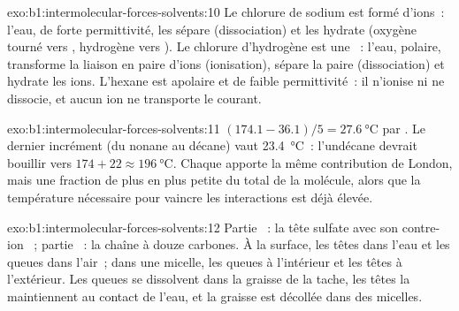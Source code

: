 \begin{solution}{exo:b1:intermolecular-forces-solvents:10}
Le chlorure de sodium est formé d'ions~: l'eau, de forte permittivité,
les sépare (dissociation) et les hydrate (oxygène tourné vers ,
hydrogène vers ). Le chlorure d'hydrogène est une ~: l'eau, polaire, transforme la liaison  en paire d'ions
 (ionisation), sépare la paire (dissociation) et hydrate les
ions. L'hexane est apolaire et de faible permittivité~: il n'ionise ni
ne dissocie, et aucun ion ne transporte le courant.
\end{solution}

\begin{solution}{exo:b1:intermolecular-forces-solvents:11}
$(174.1 - 36.1)/5 = \qty{27.6}{\celsius}$ par . Le dernier
incrément (du nonane au décane) vaut \qty{23.4}{\celsius}~: l'undécane
devrait bouillir vers $174 + 22 \approx \qty{196}{\celsius}$. Chaque
 apporte la même contribution de London, mais une fraction de
plus en plus petite du total de la molécule, alors que la température
nécessaire pour vaincre les interactions est déjà élevée.
\end{solution}

\begin{solution}{exo:b1:intermolecular-forces-solvents:12}
Partie ~: la tête sulfate  avec son contre-ion
~; partie ~: la chaîne à douze carbones. À la
surface, les têtes dans l'eau et les queues dans l'air~; dans une
micelle, les queues à l'intérieur et les têtes à l'extérieur. Les queues
se dissolvent dans la graisse de la tache, les têtes la maintiennent au
contact de l'eau, et la graisse est décollée dans des micelles.
\end{solution}


